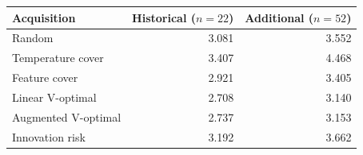 \begin{tabular}{lrr}\toprule Acquisition & Historical ($n=22$) & Additional ($n=52$)\\\midrule
Random & 3.081 & 3.552\\
Temperature cover & 3.407 & 4.468\\
Feature cover & 2.921 & 3.405\\
Linear V-optimal & 2.708 & 3.140\\
Augmented V-optimal & 2.737 & 3.153\\
Innovation risk & 3.192 & 3.662\\
\bottomrule\end{tabular}